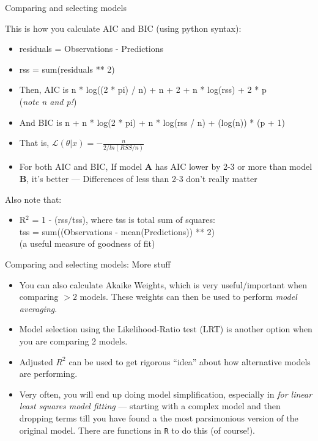 \documentclass[xcolor=x11names,compress]{beamer}
\renewcommand{\(}{\begin{columns}}
\renewcommand{\)}{\end{columns}}
\newcommand{\<}[1]{\begin{column}{#1}}
\renewcommand{\>}{\end{column}}
\begin{document}
\begin{frame}{Comparing and selecting models}

This is how you calculate AIC and BIC (using python syntax): 

\pause
\begin{itemize}\itemsep10pt
\small
	\item residuals = Observations - Predictions
	\item rss = sum(residuals ** 2) 
	\item Then, AIC is n * log((2 * pi) / n) + n + 2 + n * log(rss) + 2 * p \\
		({\it note n and p!})
	\item And BIC is n + n * log(2 * pi) + n * log(rss / n) + (log(n)) * (p + 1)

	\item That is, 	$ \mathcal{L}(\theta |x) = -\frac{n}{2/ln(RSS/n)}$
	\item For both AIC and BIC, If model {\bf A} has AIC lower by 2-3 or 
	more than model {\bf B}, it's better --- Differences of less than 2-3 
	don't really matter

\end{itemize}

    \pause
Also note that:
\begin{itemize}
\small
	\item R$^{2}$ = 1 - (rss$/$tss), where tss is total sum of squares: \\
tss = sum((Observations - mean(Predictions)) ** 2)\\
(a useful measure of goodness of fit)

\end{itemize}

\end{frame}


\begin{frame}{Comparing and selecting models: More stuff}

\begin{itemize} \itemsep12pt
	\item You can also calculate Akaike Weights, which is very useful/important
	when comparing $ > 2$ models. These weights can then be used to perform {\it
	model averaging}.

	\item Model selection using the Likelihood-Ratio test (LRT) is another
	option when you are comparing 2 models.
	
	\item Adjusted $R^2$ can be used to get rigorous ``idea'' about how
	alternative models are performing. 
	
	\item Very often, you will end up doing  model simplification, especially in
	{\it for linear least squares model fitting} --- starting with a complex
	model and then dropping terms till you have found a the most parsimonious
	version of the original model. There are functions in {\tt R} to do this (of
	course!).
 
\end{itemize}

\end{frame}
\end{document}
